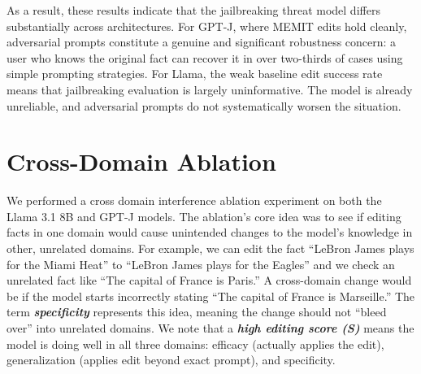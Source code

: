 \documentclass[11pt]{article}
\begin{document}
\vspace{3.5mm}
\noindent As a result, these results indicate that the jailbreaking threat model differs substantially across architectures. For GPT-J, where MEMIT edits hold cleanly, adversarial prompts constitute a genuine and significant robustness concern: a user who knows the original fact can recover it in over two-thirds of cases using simple prompting strategies. For Llama, the weak baseline edit success rate means that jailbreaking evaluation is largely uninformative. The model is already unreliable, and adversarial prompts do not systematically worsen the situation.

\section{Cross-Domain Ablation}
\label{sec:crossdomain}
We performed a cross domain interference ablation experiment on both the Llama 3.1 8B and GPT-J models. The ablation's core idea was to see if editing facts in one domain would cause unintended changes to the model's knowledge in other, unrelated domains. For example, we can edit the fact ``LeBron James plays for the Miami Heat'' to ``LeBron James plays for the Eagles'' and we check an unrelated fact like ``The capital of France is Paris.'' A cross-domain change would be if the model starts incorrectly stating ``The capital of France is Marseille.'' The term \textit{\textbf{specificity}} represents this idea, meaning the change should not ``bleed over'' into unrelated domains. We note that a \textit{\textbf{high editing score (S)}} means the model is doing well in all three domains: efficacy (actually applies the edit), generalization (applies edit beyond exact prompt), and specificity.
\end{document}
